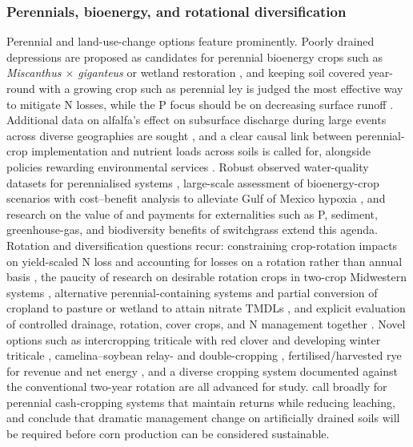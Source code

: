 \subsubsection{Perennials, bioenergy, and rotational diversification}

Perennial and land-use-change options feature prominently. Poorly drained depressions are proposed as candidates for perennial bioenergy crops such as \textit{Miscanthus $\times$ giganteus} or wetland restoration \parencite{Huang2023}, and keeping soil covered year-round with a growing crop such as perennial ley is judged the most effective way to mitigate N losses, while the P focus should be on decreasing surface runoff \parencite{Norberg2022}. Additional data on alfalfa's effect on subsurface discharge during large events across diverse geographies are sought \parencite{Arrueta2025}, and a clear causal link between perennial-crop implementation and nutrient loads across soils is called for, alongside policies rewarding environmental services \parencite{Arrueta2022}. Robust observed water-quality datasets for perennialised systems \parencite{Wilson2023}, large-scale assessment of bioenergy-crop scenarios with cost--benefit analysis to alleviate Gulf of Mexico hypoxia \parencite{Guo2018}, and research on the value of and payments for externalities such as P, sediment, greenhouse-gas, and biodiversity benefits of switchgrass \parencite{Woodbury2018} extend this agenda. Rotation and diversification questions recur: constraining crop-rotation impacts on yield-scaled N loss and accounting for losses on a rotation rather than annual basis \parencite{Zhao2016}, the paucity of research on desirable rotation crops in two-crop Midwestern systems \parencite{Pasley2021}, alternative perennial-containing systems and partial conversion of cropland to pasture or wetland to attain nitrate TMDLs \parencite{Randall2001,Gowda2007,Nangia2008}, and explicit evaluation of controlled drainage, rotation, cover crops, and N management together \parencite{Ma2007b}. Novel options such as intercropping triticale with red clover and developing winter triticale \parencite{Nance2007}, camelina--soybean relay- and double-cropping \parencite{Emmett2022}, fertilised/harvested rye for revenue and net energy \parencite{Malone2018,Malone2023}, and a diverse cropping system documented against the conventional two-year rotation \parencite{Gentry2025} are all advanced for study. \textcite{Dinnes2002} call broadly for perennial cash-cropping systems that maintain returns while reducing leaching, and \textcite{Jaynes2001} conclude that dramatic management change on artificially drained soils will be required before corn production can be considered sustainable.

